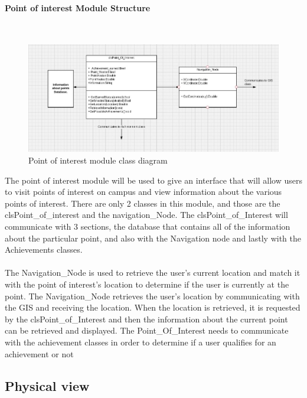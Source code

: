 \documentclass{article}
\begin{document}
				\paragraph	{Point of interest Module Structure} \mbox{} \\
			        
	
			        \begin{figure}[h]
			            \includegraphics[width=\textwidth]{./Images/POI_Class.jpg} 
			            \caption{Point of interest module class diagram}
			        \end{figure}

{The point of interest module will be used to give an interface that will allow users to visit points of interest on campus and view information about the various points of interest. There are only 2 classes in this module, and those are the clsPoint\_of\_interest and the navigation\_Node. The clsPoint\_of\_Interest will communicate with 3 sections, the database that contains all of the information about the particular point, and also with the Navigation node and lastly with the Achievements classes.\\ \\ The Navigation\_Node is used to retrieve the user's current location and match it with the point of interest's location to determine if the user is currently at the point. The Navigation\_Node retrieves the user's location by communicating with the GIS and receiving the location. When the location is retrieved, it is requested by the clsPoint\_of\_Interest and then the information about the current point can be retrieved and displayed. The Point\_Of\_Interest needs to communicate with the achievement classes in order to determine if a user qualifies for an achievement or not}

		\newpage
		\subsection{Physical view}
	
\end{document}
